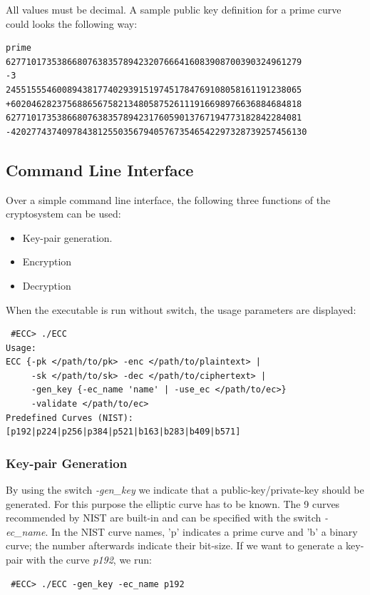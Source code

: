 \documentclass[11pt,english]{article}
\begin{document}
All values must be decimal. A sample public key definition for a prime curve could looks the following way:

\begin{verbatim}
prime
6277101735386680763835789423207666416083908700390324961279
-3
2455155546008943817740293915197451784769108058161191238065
+602046282375688656758213480587526111916698976636884684818
6277101735386680763835789423176059013767194773182842284081
-4202774374097843812550356794057673546542297328739257456130
\end{verbatim}


\subsection{Command Line Interface}
Over a simple command line interface, the following three functions of the cryptosystem can be used:
\begin{itemize}
 \item Key-pair generation.
 \item Encryption
 \item Decryption
\end{itemize}

When the executable is run without switch, the usage parameters are displayed:

\begin{verbatim}
 #ECC> ./ECC
Usage:
ECC {-pk </path/to/pk> -enc </path/to/plaintext> |
     -sk </path/to/sk> -dec </path/to/ciphertext> |
     -gen_key {-ec_name 'name' | -use_ec </path/to/ec>}
     -validate </path/to/ec>
Predefined Curves (NIST): [p192|p224|p256|p384|p521|b163|b283|b409|b571]
\end{verbatim}

\subsubsection{Key-pair Generation}
By using the switch \emph{-gen\_key} we indicate that a public-key/private-key should be generated. For this purpose the elliptic curve has to be known. The 9 curves recommended by NIST are built-in and can be specified with the switch \emph{-ec\_name}. In the NIST curve names, 'p' indicates a prime curve and 'b' a binary curve; the number afterwards indicate their bit-size. If we want to generate a key-pair with the curve \emph{p192}, we run:

\begin{verbatim}
 #ECC> ./ECC -gen_key -ec_name p192
\end{verbatim}
\end{document}

